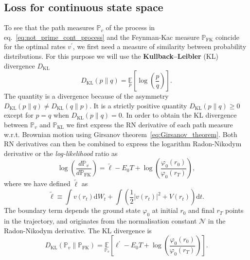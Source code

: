 \subsection{Loss for continuous state space}
\label{subsec:continuous_loss}
To see that the path measures $\mathbb{P}_v$ of the process in eq.~\eqref{eq:not_prime_cont_process}  and the Feynman-Kac measure $\mathbb{P}_{\mathrm{FK}}$ coincide for the optimal rates $v^\prime$, we first need a measure of similarity between probability distributions. For this purpose we will use the \textbf{Kullback–Leibler} (KL) divergence $D_{\mathrm{KL}}$
\begin{equation}
	D_{\mathrm{KL}}(p \| q)=\underset{p}{\mathbb{E}}\left[\log \left(\frac{p}{q}\right)\right].
\end{equation}
The quantity is a divergence because of the asymmetry $D_{\mathrm{KL}}(p \| q) \neq D_{\mathrm{KL}}(q \| p)$. It is a strictly positive quantity $D_{\mathrm{KL}}(p \| q) \geq 0$ except for $p = q$ when $D_{\mathrm{KL}}(p \| q) = 0$. In order to obtain the KL divergence between $\mathbb{P}_v$ and $\mathbb{P}_{\mathrm{KL}}$ we first express the RN derivative of each path measure w.r.t. Brownian motion using Girsanov theorem~\eqref{eq:Girsanov_theorem}. Both RN derivatives can then be combined to express the logarithm Radon-Nikodym derivative or the \emph{log-likelihood} ratio as
\begin{equation}
\log \left(\frac{d \mathbb{P}_{v}}{d \mathbb{P}_{\mathrm{FK}}}\right)=
\tilde{\ell}-
E_{0} T+
\log 
\left(
\frac{\varphi_{0}\left(r_{0}\right)}{\varphi_{0}\left(r_{T}\right)}
\right),
\end{equation}
where we have defined $\tilde{\ell}$ as
\begin{equation}
\tilde{\ell} \equiv \int v\left(r_{t}\right) \mathrm{d} W_{t}+\int \left(\frac{1}{2}\left|v\left(r_{t}\right)\right|^{2}+V\left(r_{t}\right)\right)\mathrm{d} t.
\end{equation}
The boundary term depends the ground state $\varphi_0$ at initial $r_0$ and final $r_T$ points in the trajectory, and originates from the normalisation constant $\mathcal{N}$ in the Radon-Nikodym derivative. The KL divergence is 
\begin{equation}
\label{eq:ltilde-cont}
D_{\mathrm{KL}}\left(\mathbb{P}_{v} \| \mathbb{P}_{\mathrm{FK}}\right)=\underset{\mathbb{P}_{v}}{\mathbb{E}}\left[\ell^\prime-E_{0} T+\log \left(\frac{\varphi_{0}\left(r_{0}\right)}{\varphi_{0}\left(r_{T}\right)}\right)\right].
\end{equation}
